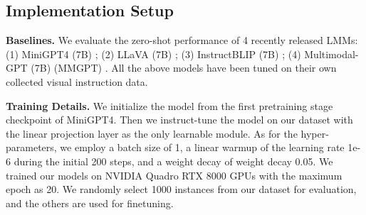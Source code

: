 \vspace{-0.1in}
\subsection{Implementation Setup}
\textbf{Baselines. }We evaluate the zero-shot performance of 4 recently released LMMs: (1) MiniGPT4 (7B) \cite{zhu2023minigpt}; (2) LLaVA (7B) \cite{liu2023visual}; (3) InstructBLIP (7B) \cite{dai2023instructblip}; (4) Multimodal-GPT (7B) (MMGPT) \cite{gong2023multimodal}. All the above models have been tuned on their own collected visual instruction data. 


\textbf{Training Details. }We initialize the model from the first pretraining stage checkpoint of MiniGPT4. Then we instruct-tune the model on our dataset with the linear projection layer as the only learnable module. As for the hyper-parameters, we  employ a batch size of 1, a linear warmup of the learning rate 1e-6 during the initial 200 steps, and a weight decay of weight decay 0.05. We trained our models on NVIDIA Quadro RTX 8000 %
GPUs with the maximum epoch as 20. 
We randomly select 1000 instances from our dataset for evaluation, and the others are used for finetuning.





